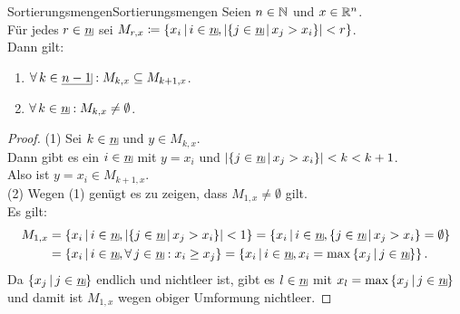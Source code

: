 \begin{lemma}{Sortierungsmengen}{Sortierungsmengen}
Seien $n \in \mathbb{N}$ und $x \in \mathbb{R}^n$.\\
Für jedes $r \in \haken n$ sei
$ M_{r,x}\coloneqq \menge{x_i}{i\in\haken n,\abs{\menge{j\in\haken n}{x_j>x_i}}<r}$.\\
Dann gilt:
\begin{enumerate}[(1)]
	\item \label{Sortierungsmengen1}
	$\forall\, k \in \haken {n-1}: M_{k, x} \subseteq M_{k+1,x}$.
	\item \label{Sortierungsmengen2}
	$\forall\, k \in \haken n: M_{k, x} \neq \emptyset$.
\end{enumerate}
\end{lemma}
\begin{proof}
(1) Sei $k \in \haken n$ und $y \in M_{k, x}$.\\
Dann gibt es ein $i \in \haken n$ mit $y = x_i$ und
$\abs{\menge{j\in\haken n}{x_j>x_i}}<k < k+1$.\\
Also ist $y=x_i \in M_{k+1,x}$.\\
(2) Wegen (1) genügt es zu zeigen, dass $M_{1, x} \neq \emptyset$ gilt.\\
Es gilt:
\begin{align*}
M_{1,x} &= \menge{x_i}{i\in\haken n,\abs{\menge{j\in\haken n}{x_j>x_i}}<1}
= \menge{x_i}{i\in\haken n, \menge{j\in\haken n}{x_j>x_i} = \emptyset}\\
&= \menge{x_i}{i\in\haken n, \forall\, j \in \haken n: x_i \ge x_j}
= \menge{x_i}{i \in \haken n, x_i = \max\menge{x_j}{j\in \haken n}}\text.
\end{align*}
Da $\menge{x_j}{j \in \haken n}$ endlich und nichtleer ist, gibt es
$l \in \haken n$ mit $x_l = \max\menge{x_j}{j \in \haken n}$ und damit ist
$M_{1, x}$ wegen obiger Umformung nichtleer.
\end{proof}